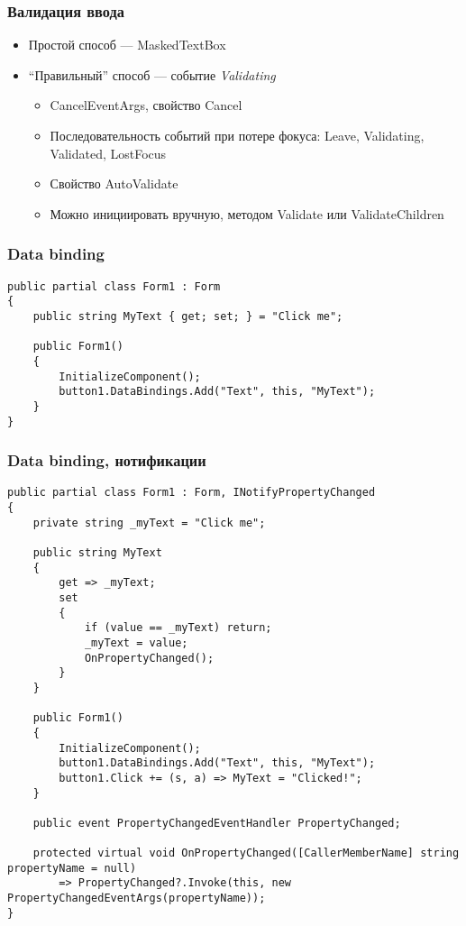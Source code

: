 \documentclass[xetex,mathserif,serif]{beamer}
\begin{document}
	\begin{frame}
		\frametitle{Валидация ввода}
		\begin{itemize}
			\item Простой способ --- MaskedTextBox
			\item ``Правильный'' способ --- событие \textit{Validating}
			\begin{itemize}
				\item CancelEventArgs, свойство Cancel
				\item Последовательность событий при потере фокуса: Leave, Validating, Validated, LostFocus
				\item Свойство AutoValidate
				\item Можно инициировать вручную, методом Validate или ValidateChildren
			\end{itemize}
		\end{itemize}
	\end{frame}

	\begin{frame}[fragile]
		\frametitle{Data binding}
		\begin{verbatim}
public partial class Form1 : Form
{
    public string MyText { get; set; } = "Click me";

    public Form1()
    {
        InitializeComponent();
        button1.DataBindings.Add("Text", this, "MyText");
    }
}
		\end{verbatim}
	\end{frame}

	\begin{frame}[fragile]
		\frametitle{Data binding, нотификации}
		\begin{ssmall}
			\begin{verbatim}
public partial class Form1 : Form, INotifyPropertyChanged
{
    private string _myText = "Click me";

    public string MyText
    {
        get => _myText;
        set
        {
            if (value == _myText) return;
            _myText = value;
            OnPropertyChanged();
        }
    }

    public Form1()
    {
        InitializeComponent();
        button1.DataBindings.Add("Text", this, "MyText");
        button1.Click += (s, a) => MyText = "Clicked!";
    }

    public event PropertyChangedEventHandler PropertyChanged;

    protected virtual void OnPropertyChanged([CallerMemberName] string propertyName = null)
        => PropertyChanged?.Invoke(this, new PropertyChangedEventArgs(propertyName));
}
			\end{verbatim}
		\end{ssmall}
	\end{frame}
\end{document}

